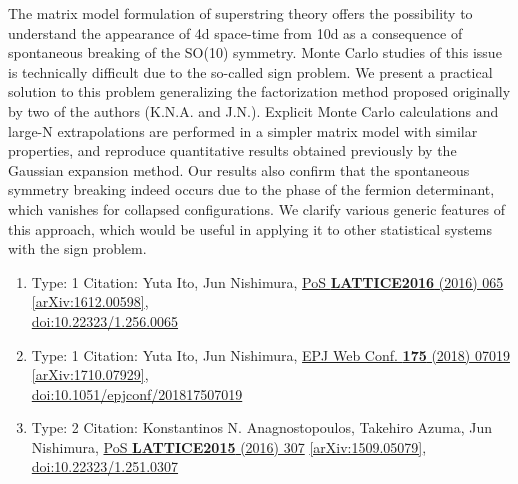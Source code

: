 \documentclass[a4paper,10pt]{article}
\begin{document}
\begin{enumerate}
The matrix model formulation of superstring theory offers the possibility to understand the appearance of 4d space-time from 10d as a consequence of spontaneous breaking of the SO(10) symmetry. Monte Carlo studies of this issue is technically difficult due to the so-called sign problem. We present a practical solution to this problem generalizing the factorization method proposed originally by two of the authors (K.N.A. and J.N.). Explicit Monte Carlo calculations and large-N extrapolations are performed in a simpler matrix model with similar properties, and reproduce quantitative results obtained previously by the Gaussian expansion method. Our results also confirm that the spontaneous symmetry breaking indeed occurs due to the phase of the fermion determinant, which vanishes for collapsed configurations. We clarify various generic features of this approach, which would be useful in applying it to other statistical systems with the sign problem.
\begin{enumerate}
  \item Type: 1 Citation: Yuta Ito, Jun Nishimura, \href{https://www.doi.org/10.22323/1.256.0065}{PoS {\bf LATTICE2016} (2016) 065}  \href{https://arxiv.org/abs/1612.00598}{[arXiv:1612.00598]},\\\href{https://www.doi.org/10.22323/1.256.0065}{doi:10.22323/1.256.0065}
  \item Type: 1 Citation: Yuta Ito, Jun Nishimura, \href{https://www.doi.org/10.1051/epjconf/201817507019}{EPJ Web Conf. {\bf 175} (2018) 07019}  \href{https://arxiv.org/abs/1710.07929}{[arXiv:1710.07929]},\\\href{https://www.doi.org/10.1051/epjconf/201817507019}{doi:10.1051/epjconf/201817507019}
  \item Type: 2 Citation: Konstantinos N. Anagnostopoulos, Takehiro Azuma, Jun Nishimura, \href{https://www.doi.org/10.22323/1.251.0307}{PoS {\bf LATTICE2015} (2016) 307}  \href{https://arxiv.org/abs/1509.05079}{[arXiv:1509.05079]},\\\href{https://www.doi.org/10.22323/1.251.0307}{doi:10.22323/1.251.0307}

\end{enumerate}
\end{enumerate}
\end{document}
